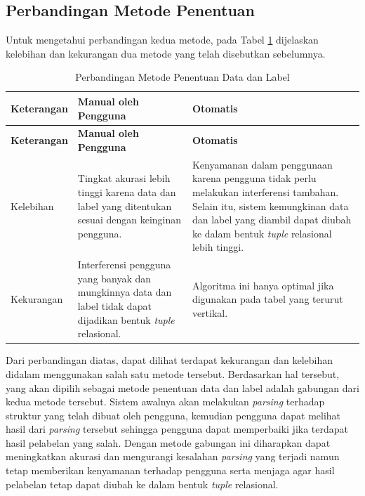 	\subsection{Perbandingan Metode Penentuan}
	Untuk mengetahui perbandingan kedua metode, pada Tabel \ref{MetodePenentuan} dijelaskan kelebihan dan kekurangan dua metode yang telah disebutkan sebelumnya.
	\begin{longtable}{ | p{3cm} | p{4cm} | p{4cm} | }
	    \caption{Perbandingan Metode Penentuan Data dan Label}
	    \label{MetodePenentuan}\\ \hline
	    \centering\bfseries{Keterangan} & \centering\bfseries{Manual oleh Pengguna} & \centering\bfseries{Otomatis} \tabularnewline \hline
	    \endfirsthead
	    \hline
	    \centering\bfseries{Keterangan} & \centering\bfseries{Manual oleh Pengguna} & \centering\bfseries{Otomatis} \tabularnewline \hline
	    \endhead
	    Kelebihan & Tingkat akurasi lebih tinggi karena data dan label yang ditentukan sesuai dengan keinginan pengguna. & Kenyamanan dalam penggunaan karena pengguna tidak perlu melakukan interferensi tambahan. Selain itu, sistem kemungkinan data dan label yang diambil dapat diubah ke dalam bentuk \textit{tuple} relasional lebih tinggi. \\ \hline
	    Kekurangan & Interferensi pengguna yang banyak dan mungkinnya data dan label tidak dapat dijadikan bentuk \textit{tuple} relasional. & Algoritma ini hanya optimal jika digunakan pada tabel yang terurut vertikal. \\ \hline
  	\end{longtable}
  	Dari perbandingan diatas, dapat dilihat terdapat kekurangan dan kelebihan didalam menggunakan salah satu metode tersebut. Berdasarkan hal tersebut, yang akan dipilih sebagai metode penentuan data dan label adalah gabungan dari kedua metode tersebut. Sistem awalnya akan melakukan \textit{parsing} terhadap struktur yang telah dibuat oleh pengguna, kemudian pengguna dapat melihat hasil dari \textit{parsing} tersebut sehingga pengguna dapat memperbaiki jika terdapat hasil pelabelan yang salah. Dengan metode gabungan ini diharapkan dapat meningkatkan akurasi dan mengurangi kesalahan \textit{parsing} yang terjadi namun tetap memberikan kenyamanan terhadap pengguna serta menjaga agar hasil pelabelan tetap dapat diubah ke dalam bentuk \textit{tuple} relasional.


